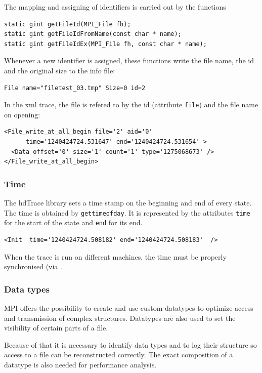 \documentclass[a4paper,12pt,pdftex]{scrartcl}
\begin{document}
The mapping and assigning of identifiers is carried out by the
functions
\begin{lstlisting}
static gint getFileId(MPI_File fh);
static gint getFileIdFromName(const char * name);
static gint getFileIdEx(MPI_File fh, const char * name);
\end{lstlisting}

Whenever a new identifier is assigned, these functions write the file
name, the id and the original size to the info file:
\begin{lstlisting}
File name="filetest_03.tmp" Size=0 id=2
\end{lstlisting}

In the xml trace, the file is refered to by the id (attribute \verb/file/) and the file name
on opening:
\begin{lstlisting}
<File_write_at_all_begin file='2' aid='0' 
      time='1240424724.531647' end='1240424724.531654' >
  <Data offset='0' size='1' count='1' type='1275068673' />
</File_write_at_all_begin>
\end{lstlisting}

\subsubsection{Time}
The hdTrace library sets a time stamp on the beginning and end of
every state. The time is obtained by \verb/gettimeofday/. It is
represented by the attributes \verb/time/ for the start of the state
and \verb/end/ for its end.
\begin{lstlisting}
<Init  time='1240424724.508182' end='1240424724.508183'  />
\end{lstlisting}

When the trace is run on different machines, the time must be properly
synchronised (via . 

\subsubsection{Data types}

MPI offers the possibility to create and use custom datatypes to
optimize access and transmission of complex structures. 
Datatypes are also used to set the visibility of certain parts of a
file.

Because of that it is necessary to identify data types and to log
their structure so access to a file can be reconstructed
correctly. The exact composition of a datatype is also needed for
performance analysis.
\end{document}
